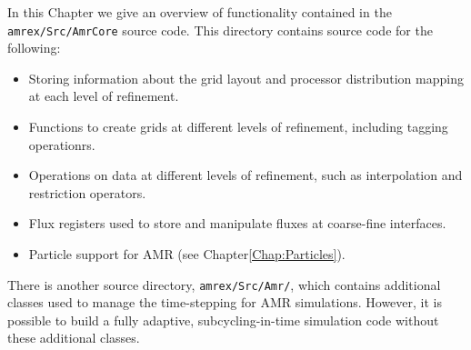 In this Chapter we give an overview of functionality contained in the {\tt amrex/Src/AmrCore} source code.
This directory contains source code for the following:
\begin{itemize}
\item Storing information about the grid layout and processor distribution mapping
at each level of refinement.
\item Functions to create grids at different levels of refinement, including tagging
operationrs.
\item Operations on data at different levels of refinement, such as interpolation and
restriction operators.
\item Flux registers used to store and manipulate fluxes at coarse-fine interfaces.
\item Particle support for AMR (see Chapter\ref{Chap:Particles}).
\end{itemize}
There is another source directory, {\tt amrex/Src/Amr/}, which contains
additional classes used to manage the time-stepping for AMR simulations.
However, it is possible to build a fully adaptive, subcycling-in-time simulation code
without these additional classes.

